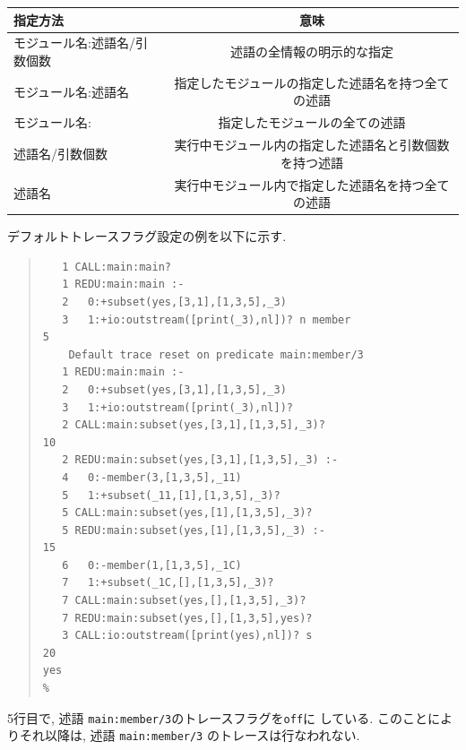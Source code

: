 \documentclass[a4,titlepage]{jsreport}
\begin{document}
\vspace{3mm}
\begin{center}
\begin{tabular}{l|c}\hline
指定方法  &意味\\ \hline
モジュール名:述語名/引数個数 &述語の全情報の明示的な指定 \\
モジュール名:述語名 &指定したモジュールの指定した述語名を持つ全ての述語 \\
モジュール名:&指定したモジュールの全ての述語 \\
述語名/引数個数&実行中モジュール内の指定した述語名と引数個数を持つ述語 \\
述語名&実行中モジュール内で指定した述語名を持つ全ての述語\\ \hline
\end{tabular}
\end{center}
\vspace{3mm}

デフォルトトレースフラグ設定の例を以下に示す.  

\begin{quote}%
\begin{Verbatim}[frame=single,baselinestretch=0.8]
% subset -t                                                           1
   1 CALL:main:main? 
   1 REDU:main:main :-
   2   0:+subset(yes,[3,1],[1,3,5],_3)
   3   1:+io:outstream([print(_3),nl])? n member                      5
	Default trace reset on predicate main:member/3
   1 REDU:main:main :-
   2   0:+subset(yes,[3,1],[1,3,5],_3)
   3   1:+io:outstream([print(_3),nl])? 
   2 CALL:main:subset(yes,[3,1],[1,3,5],_3)?                         10
   2 REDU:main:subset(yes,[3,1],[1,3,5],_3) :-
   4   0:-member(3,[1,3,5],_11)
   5   1:+subset(_11,[1],[1,3,5],_3)? 
   5 CALL:main:subset(yes,[1],[1,3,5],_3)? 
   5 REDU:main:subset(yes,[1],[1,3,5],_3) :-                         15
   6   0:-member(1,[1,3,5],_1C)
   7   1:+subset(_1C,[],[1,3,5],_3)? 
   7 CALL:main:subset(yes,[],[1,3,5],_3)? 
   7 REDU:main:subset(yes,[],[1,3,5],yes)? 
   3 CALL:io:outstream([print(yes),nl])? s                           20
yes
% 
\end{Verbatim}
\end{quote}

5行目で, 述語 {\tt main:member/3}のトレースフラグを{\tt off}に
している.  このことによりそれ以降は, 述語 {\tt main:\linebreak[1]member/3}
のトレースは行なわれない.  
\end{document}
